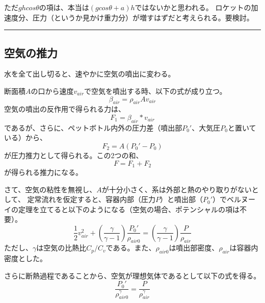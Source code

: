 \documentclass{article}
\begin{document}
ただ$g h cos \theta$の項は、本当は$(g cos \theta + a)h $ではないかと思われる。
ロケットの加速度分、圧力（というか見かけ重力分）が増すはずだと考えられる。要検討。

\vspace{3mm}
\hrule
\vspace{3mm}

\subsection{ 空気の推力 }

水を全て出し切ると、速やかに空気の噴出に変わる。

断面積$A$の口から速度$v_{air}$で空気を噴出する時、以下の式が成り立つ。
\begin{equation}
\beta_{air} = \rho_{air} A v_{air}
\end{equation}
空気の噴出の反作用で得られる力は、
\begin{equation}
F_1 = \beta_{air} * v_{air}
\end{equation}
であるが、さらに、ペットボトル内外の圧力差（噴出部$P_0'$、大気圧$P_0$と置いている）から、
\begin{equation}
F_2 = A \left( P_0' - P_0 \right)
\end{equation}
が圧力推力として得られる。この2つの和、
\begin{equation}
F = F_1 + F_2
\end{equation}
が得られる推力になる。

さて、空気の粘性を無視し、$A$が十分小さく、系は外部と熱のやり取りがないとして、
定常流れを仮定すると、容器内部（圧力$P$）と噴出部（$P_0'$）でベルヌーイの定理を立てると以下のようになる（空気の場合、ポテンシャルの項は不要）。
\begin{equation}
\frac{1}{2} v_{air}^2 + \left( \frac{\gamma}{\gamma - 1} \right)\frac{P_0'}{\rho_{air0}} =  \left( \frac{\gamma}{\gamma - 1} \right)\frac{P}{\rho_{air}}
\end{equation}
ただし、$\gamma$は空気の比熱比${C_p}/{C_v}$である。また、$\rho_{air0}$は噴出部密度、$\rho_{air}$は容器内密度とした。

さらに断熱過程であることから、空気が理想気体であるとして以下の式を得る。
\begin{equation}
\frac{P_0'}{\rho_{air0}^\gamma} = \frac{P}{\rho_{air}^\gamma}
\end{equation}
\end{document}
